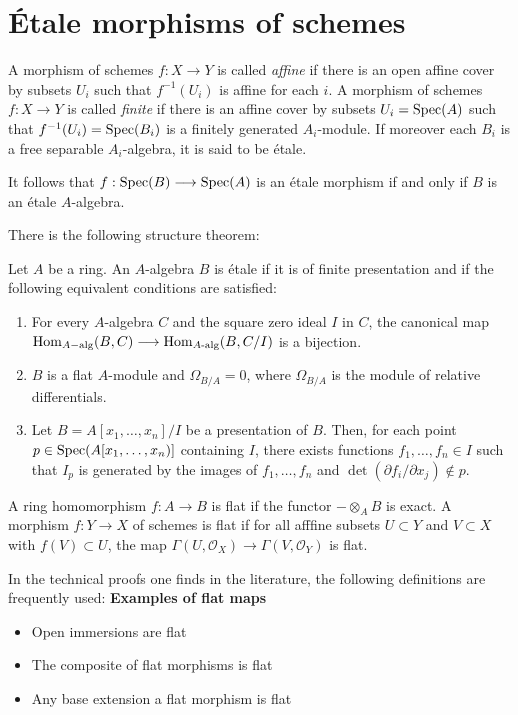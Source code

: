 \section{\'Etale morphisms of schemes}
\begin{definition}
	A morphism of schemes $f: X \to Y$ is called \textit{affine} if there is an open affine cover by subsets $U_i$ such that $f^{-1}(U_i)$ is affine for each $i$. A morphism of schemes $f: X \to Y$ is called \textit{finite} if there is an affine cover by subsets $U_i = \operatorname{Spec}(A)$ such that $f^{-1}(U_i) = \operatorname{Spec}(B_i)$ is a finitely generated $A_i$-module. If moreover each $B_i$ is a free separable $A_i$-algebra, it is said to be \'etale.
\end{definition}
It follows that $f: \operatorname{Spec}(B) \longrightarrow \operatorname{Spec}(A)$ is an \'etale morphism if and only if $B$ is an \'etale $A$-algebra.

There is the following structure theorem:
\begin{theorem}
	Let $A$ be a ring. An $A$-algebra $B$ is \'etale if it is of finite presentation and if the following equivalent conditions are satisfied:
	\begin{enumerate}
		\item For every $A$-algebra $C$ and the square zero ideal $I$ in $C$, the canonical map $\operatorname{Hom}_{A-\text{alg}}(B,C) \longrightarrow \operatorname{Hom}_{A\text{-alg}}(B,C/I)$ is a bijection.
		\item $B$ is a flat $A$-module and $\Omega_{B/A} = 0$, where $\Omega_{B/A}$ is the module of relative differentials.
		\item Let $B = A[x_1, \dots, x_n]/I$ be a presentation of $B$. Then, for each point $p \in \operatorname{Spec}(A[x_1, \dots, x_n)]$ containing $I$, there exists functions $f_1, \dots, f_n \in I$ such that $I_p$ is generated by the images of $f_1, \dots, f_n$ and $\det(\partial f_i/\partial x_j) \not\in p$.
	\end{enumerate}
\end{theorem}


\begin{definition}\label{def:flatness}
	A ring homomorphism $f: A \to B$ is flat if the functor $- \otimes_A B$ is exact. A morphism $f: Y \to X$ of schemes is flat if for all afffine subsets $U \subset Y$ and $V \subset X$ with $f(V) \subset U$, the map $\Gamma(U, \mathcal{O}_X) \to \Gamma(V, \mathcal{O}_Y)$ is flat.
\end{definition}

In the technical proofs one finds in the literature, the following definitions are frequently used:
\textbf{Examples of flat maps}
\begin{itemize}
	\item Open immersions are flat
	\item The composite of flat morphisms is flat
	\item Any base extension a flat morphism is flat
\end{itemize}

